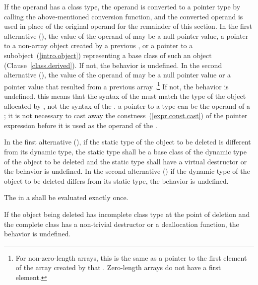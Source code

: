 \pnum
{}
If the operand has a class type, the operand is converted to a pointer
type by calling the above-mentioned conversion function, and the
converted operand is used in place of the original operand for the
remainder of this section.
%
In the first alternative
(), the value of the operand of  may
be a null pointer value, a pointer to a non-array object
created by a previous ,
or a pointer to a
subobject~(\ref{intro.object}) representing a base class of such an
object (Clause~\ref{class.derived}). If not, the behavior is undefined.
%
%
In the second alternative (), the value of the
operand of 
may be a null pointer value or a pointer value
that resulted from
a previous array .\footnote{For non-zero-length
arrays, this is the same as a pointer to the first
element of the array created by that .
Zero-length arrays do not have a first element.}
If not, the behavior is undefined.
\enternote 
this means that the syntax of the  must
match the type of the object allocated by , not the syntax of the
.
\exitnote 
\enternote 
a pointer to a  type can be the operand of a
; it is not necessary to cast away the
constness~(\ref{expr.const.cast}) of the pointer expression before it is
used as the operand of the .
\exitnote 

\pnum
{}%
In the first alternative (), if the static type of
the object to be deleted is different from its dynamic type, the static type shall be
a base class of the dynamic type of the object to be deleted and the static type shall
have a virtual destructor or the behavior is undefined. In the second
alternative () if the dynamic type of the object to
be deleted differs from its static type, the behavior is undefined.

\pnum
The  in a  shall
be evaluated exactly once.

\pnum
{}%
If the object being deleted has incomplete class type at the point of
deletion and the complete class has a non-trivial destructor or a
deallocation function, the behavior is undefined.

